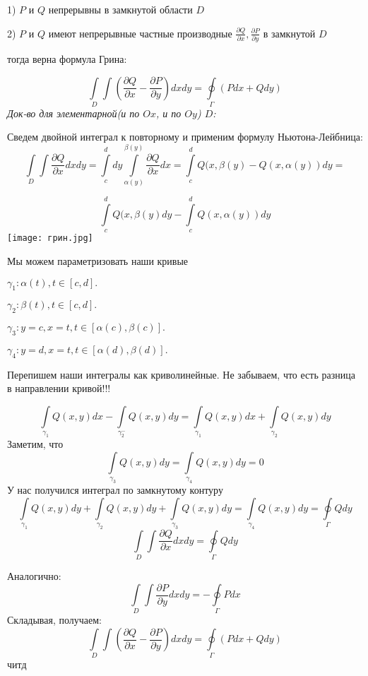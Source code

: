 \documentclass{article}
\begin{document}
1)  $P$ и $Q$ непрерывны в замкнутой области $D$


2) $P$ и $Q$ имеют непрерывные частные производные $\frac{\partial Q}{\partial x},\frac{\partial P}{\partial y} $ в замкнутой $D$

тогда верна формула Грина:

\begin{equation}\label{eq3}
	\int\limits_D \int (\frac{\partial Q}{\partial x} - \frac{\partial P}{\partial y}) dxdy =
	\oint\limits_{\Gamma} (Pdx + Qdy)
\end{equation}
\textit{Док-во для элементарной(и по $Ox$, и по $Oy$) $D$:} 

	Сведем двойной интеграл к повторному и применим формулу Ньютона-Лейбница:
$$
\int\limits_D \int \frac{\partial Q}{\partial x} dxdy = 
\int\limits_{c}^d dy \int\limits_{\alpha(y)}^{\beta(y)}\frac{\partial Q}{\partial x}dx = 
\int\limits_{c}^d  Q(x,\beta(y) - Q(x,\alpha(y))dy =
$$

$$
\int\limits_{c}^d  Q(x,\beta(y)dy -\int\limits_{c}^d Q(x,\alpha(y))dy
$$  
\texttt{[image: грин.jpg]}	

Мы можем параметризовать наши кривые 

	$
	\gamma_1: \alpha(t) , t \in [c , d].
	$
	
	$
	\gamma_2: \beta(t) , t \in [c , d].
	$
	
	$
	\gamma_3:  y = c, x = t , t \in [\alpha(c) , \beta(c)].
	$
	
	$
	\gamma_4:  y = d, x = t , t \in [\alpha(d) , \beta(d)].	
	$
	
	


Перепишем наши интегралы как криволинейные. Не забываем, что есть разница в направлении кривой!!!

$$
\int\limits_{\gamma_1}  Q(x,y)dx -\int\limits_{\gamma_2^-} Q(x,y)dy
= \int\limits_{\gamma_1}  Q(x,y)dx + \int\limits_{\gamma_2} Q(x,y)dy
$$  
Заметим, что
$$ 
\int\limits_{\gamma_3}  Q(x,y)dy = \int\limits_{\gamma_4} Q(x,y)dy = 0
$$
У нас получился интеграл по замкнутому контуру
$$ 
\int\limits_{\gamma_1}  Q(x,y)dy + \int\limits_{\gamma_2} Q(x,y)dy +
\int\limits_{\gamma_3}  Q(x,y)dy = \int\limits_{\gamma_4} Q(x,y)dy = 
\oint\limits_{\Gamma} Qdy
$$
$$
\int\limits_D \int\frac{\partial Q}{\partial x}dxdy = 
\oint\limits_{\Gamma} Qdy
$$

Аналогично:
$$
\int\limits_D \int\frac{\partial P}{\partial y}dxdy = 
-\oint\limits_{\Gamma} Pdx
$$
Складывая, получаем:
$$
\int\limits_D \int( \frac{\partial Q}{\partial x} - \frac{\partial P}{\partial y} )dxdy =
\oint\limits_{\Gamma} (Pdx + Qdy)
$$
читд
\end{document}
